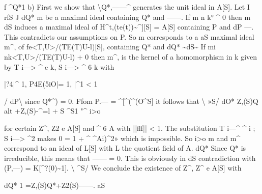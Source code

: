 \documentclass[
  10pt,
]{article}
\newenvironment{Shaded}{}{}
\newcommand{\NormalTok}[1]{#1}
\begin{document}
\begin{Shaded}
\begin{Highlighting}[]
\NormalTok{                             f      \^{}Q*1}
\NormalTok{   b) First we show that \textbackslash{}Q*,——\^{} generates the unit ideal in A[S]. Let}
\NormalTok{                          I   rfS J}
\NormalTok{                                          dQ*}
\NormalTok{m be a maximal ideal containing Q* and ——. If m n k° \^{} 0 then m}
\NormalTok{                                           dS}
\NormalTok{induces a maximal ideal of H\^{}t,(te(t))\textasciitilde{}\^{}][S] = A[S] containing P and}
\NormalTok{dP}
\NormalTok{—. This contradicts our assumptions on P. So m corresponds to a}
\NormalTok{aS}
\NormalTok{maximal ideal m\^{}, of fe\textless{}T,U\textgreater{}/(TE(T)U{-}l)[S], containing Q* and}
\NormalTok{dQ*}
\NormalTok{\textasciitilde{}dS\textasciitilde{}\textquotesingle{}}
\NormalTok{   If mi nk\textless{}T,U\textgreater{}/(TE(T)U{-}l) + 0 then m\^{}, is the kernel of a}
\NormalTok{homomorphism in k given by T i—\textgreater{} \^{} e k, S i—\textgreater{} \^{} 6 k with}

\NormalTok{                  |?4|\^{} 1,          P4E(5iO|= 1,     |\^{}1 \textless{} 1}

\NormalTok{                                 / dP\textbackslash{}}
\NormalTok{since Q*\^{}) = 0. Ffom              P.— = \^{}[\^{}(\^{}(O\textquotesingle{}\^{}S] it follows that}
\NormalTok{                                 \textbackslash{} »S/}
\NormalTok{                                 dO*}
\NormalTok{                   Z,(S)Q alt +Z,(S){-}\^{}=l + S \^{}S1}
\NormalTok{                                  "\^{}       i\textgreater{}o}

\NormalTok{for certain Z\^{}, Z2 e A[S] and \^{} 6 A with ||flf|| \textless{} 1. The substitution}
\NormalTok{T i—\^{} \^{} i ; S i—\textgreater{} \^{}2 makes 0 = 1 + \^{} \^{}Ai)\^{}2» which is impossible. So}
\NormalTok{                                   i\textgreater{}o}
\NormalTok{m and m\^{} correspond to an ideal of L[S] with L the quotient field of A.}
\NormalTok{                                              dQ*}
\NormalTok{Since Q* is irreducible, this means that —— = 0. This is obviously in}
\NormalTok{                                         dS}
\NormalTok{contradiction with (P,—) = K[\^{}?(0)\textasciitilde{}1].}
\NormalTok{                   \textbackslash{} \^{}S/}
\NormalTok{      We conclude the existence of Z\^{}, Z\^{} e A[S] with}

\NormalTok{                                                   dQ*}
\NormalTok{                        1 =Z,(S)Q*+Z2(S)——.}
\NormalTok{                                         aS}


\end{Highlighting}
\end{Shaded}
\end{document}
